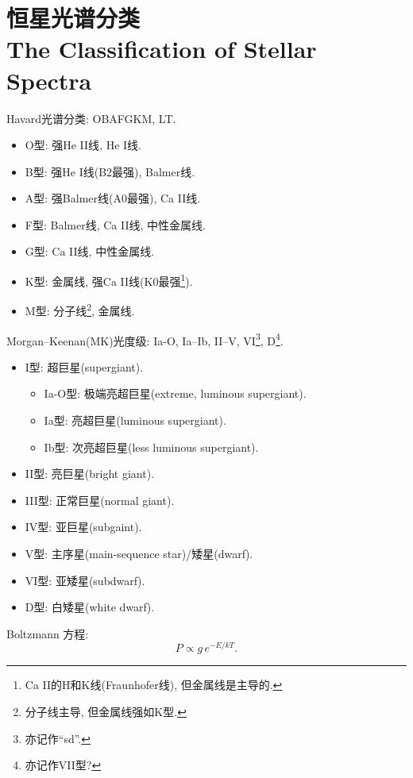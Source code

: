 \chapter{恒星光谱分类\\The Classification of Stellar Spectra}

Havard光谱分类: OBAFGKM, LT.
\begin{itemize}
    \item O型: 强He II线, He I线.
    \item B型: 强He I线(B2最强), Balmer线.
    \item A型: 强Balmer线(A0最强), Ca II线.
    \item F型: Balmer线, Ca II线, 中性金属线.
    \item G型: Ca II线, 中性金属线.
    \item K型: 金属线, 强Ca II线(K0最强\footnote{Ca II的H和K线(Fraunhofer线), 但金属线是主导的.}).
    \item M型: 分子线\footnote{分子线主导, 但金属线强如K型.}, 金属线.
\end{itemize}

Morgan--Keenan(MK)光度级: Ia-O, Ia--Ib, II--V, VI\footnote{亦记作``sd''.}, D\footnote{亦记作VII型?}.
\begin{itemize}
    \item I型: 超巨星(supergiant).
    \begin{itemize}
        \item Ia-O型: 极端亮超巨星(extreme, luminous supergiant).
        \item Ia型: 亮超巨星(luminous supergiant).
        \item Ib型: 次亮超巨星(less luminous supergiant).
    \end{itemize}
    \item II型: 亮巨星(bright giant).
    \item III型: 正常巨星(normal giant).
    \item IV型: 亚巨星(subgaint).
    \item V型: 主序星(main-sequence star)/矮星(dwarf).
    \item VI型: 亚矮星(subdwarf).
    \item D型: 白矮星(white dwarf).
\end{itemize}

Boltzmann 方程:
\begin{equation*}
    P \propto g\,e^{-E/kT}.
\end{equation*}

